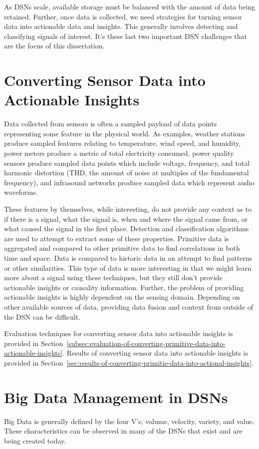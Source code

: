 As DSNs scale, available storage must be balanced with the amount of data being retained. Further, once data is collected, we need strategies for turning sensor data into actionable data and insights. This generally involves detecting and classifying signals of interest. It's these last two important DSN challenges that are the focus of this dissertation.

\section{Converting Sensor Data into Actionable Insights}\label{sec:converting-sensor-data-into-actionable-insights}
Data collected from sensors is often a sampled payload of data points representing some feature in the physical world. As examples, weather stations produce sampled features relating to temperature, wind speed, and humidity, power meters produce a metric of total electricity consumed, power quality sensors produce sampled data points which include voltage, frequency, and total harmonic distortion (THD, the amount of noise at multiples of the fundamental frequency), and infrasound networks produce sampled data which represent audio waveforms.

These features by themselves, while interesting, do not provide any context as to if there is a signal, what the signal is, when and where the signal came from, or what caused the signal in the first place. Detection and classification algorithms are used to attempt to extract some of these properties. Primitive data is aggregated and compared to other primitive data to find correlations in both time and space. Data is compared to historic data in an attempt to find patterns or other similarities. This type of data is more interesting in that we might learn more about a signal using these techniques, but they still don't provide actionable insights or causality information. Further, the problem of providing actionable insights is highly dependent on the sensing domain. Depending on other available sources of data, providing data fusion and context from outside of the DSN can be difficult.

Evaluation techniques for converting sensor data into actionable insights is provided in Section~\ref{subsec:evaluation-of-converting-primitive-data-into-actionable-insights}. Results of converting sensor data into actionable insights is provided in Section~\ref{sec:results-of-converting-primitie-data-into-actional-insights}.

\section{Big Data Management in DSNs}\label{sec:big-data-management-in-dsns}
Big Data is generally defined by the four V's; volume, velocity, variety, and value. These characteristics can be observed in many of the DSNs that exist and are being created today.

